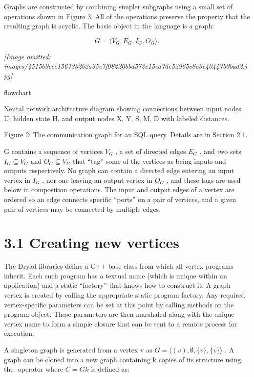 \documentclass[
]{article}
\begin{document}
Graphs are constructed by combining simpler subgraphs using a small set
of operations shown in Figure 3. All of the operations preserve the
property that the resulting graph is acyclic. The basic object in the
language is a graph:

\[
G = \langle V _ {G}, E _ {G}, I _ {G}, O _ {G} \rangle .
\]

\textit{[Image omitted: images/4515b9cee1567332b2a95e7f08220bbd572c15ea7de52965c8e3e40447b0bad2.jpg]}

flowchart

Neural network architecture diagram showing connections between input
nodes U, hidden state H, and output nodes X, Y, S, M, D with labeled
distances.

Figure 2: The communication graph for an SQL query. Details are in
Section 2.1.

G contains a sequence of vertices \(V_{G}\) , a set of directed edges
\(E_{G}\) , and two sets \(I_{G} \subseteq V_{G}\) and
\(O_{G} \subseteq V_{G}\) that ``tag'' some of the vertices as being
inputs and outputs respectively. No graph can contain a directed edge
entering an input vertex in \(I_{G}\) , nor one leaving an output vertex
in \(O_{G}\) , and these tags are used below in composition operations.
The input and output edges of a vertex are ordered so an edge connects
specific ``ports'' on a pair of vertices, and a given pair of vertices
may be connected by multiple edges.

\section{3.1 Creating new vertices}\label{creating-new-vertices}

The Dryad libraries define a C++ base class from which all vertex
programs inherit. Each such program has a textual name (which is unique
within an application) and a static ``factory'' that knows how to
construct it. A graph vertex is created by calling the appropriate
static program factory. Any required vertex-specific parameters can be
set at this point by calling methods on the program object. These
parameters are then marshaled along with the unique vertex name to form
a simple closure that can be sent to a remote process for execution.

A singleton graph is generated from a vertex v as
\(G = \langle(v), \emptyset, \{v\}, \{v\} \rangle\) . A graph can be
cloned into a new graph containing k copies of its structure using the
\(\hat{}\) operator where \(C = G^{\hat{}}k\) is defined as:
\end{document}
